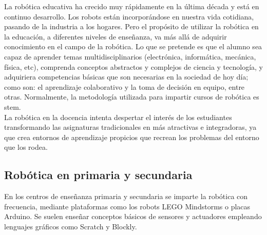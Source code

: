 La robótica educativa ha crecido muy rápidamente en la última década y está en continuo desarrollo. Los robots están incorporándose en nuestra vida cotidiana, pasando de la industria a los hogares. Pero el propósito de utilizar la robótica en la educación, a diferentes niveles de enseñanza, va más allá de adquirir conocimiento en el campo de la robótica. Lo que se pretende es que el alumno sea capaz de aprender temas multidisciplinarios (electrónica, informática, mecánica, física, etc), comprenda conceptos abstractos y complejos de ciencia y tecnología, y adquiriera competencias básicas que son necesarias en la sociedad de hoy día; como son: el aprendizaje colaborativo y la toma de decisión en equipo, entre otras. Normalmente, la metodología utilizada para impartir cursos de robótica es \acrfull{stem}. \\

La robótica en la docencia intenta despertar el interés de los estudiantes transformando las asignaturas tradicionales en más atractivas e integradoras, ya que crea entornos de aprendizaje propicios que recrean los problemas del entorno que los rodea. \\

\subsection{Robótica en primaria y secundaria}

En los centros de enseñanza primaria y secundaria se imparte la robótica con frecuencia, mediante plataformas como los robots LEGO Mindstorms o placas Arduino. Se suelen enseñar conceptos básicos de sensores y actuadores empleando lenguajes gráficos como Scratch y Blockly. \\

